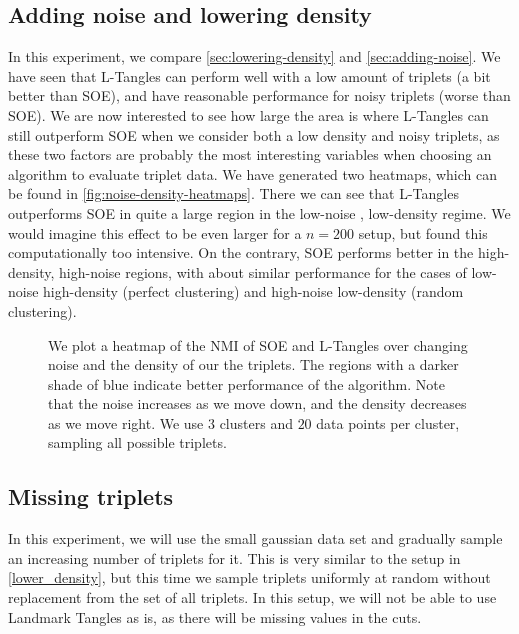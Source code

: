 \subsection{Adding noise and lowering density}
In this experiment, we compare \autoref{sec:lowering-density} and \autoref{sec:adding-noise}. We have seen that L-Tangles can perform well with a low
amount of triplets (a bit better than SOE), and have reasonable performance for noisy triplets (worse than SOE). We are now interested to see how large the area is
where L-Tangles can still outperform SOE when we consider both a low density and noisy triplets, as these two factors are probably the most interesting variables
when choosing an algorithm to evaluate triplet data. We have generated two heatmaps, which can be found in \autoref{fig:noise-density-heatmaps}. 
There we can see that L-Tangles outperforms SOE in quite a large region in the low-noise , low-density regime. We would imagine this effect to be even larger
for a $n=200$ setup, but found this computationally too intensive. On the contrary, SOE performs better in the high-density, high-noise regions, with about similar performance
for the cases of low-noise high-density (perfect clustering) and high-noise low-density (random clustering).

\onecolumn
\begin{figure}[ht]
    \centering
    \caption{
        We plot a heatmap of the NMI of SOE and L-Tangles over changing noise and the density of our the triplets. 
        The regions with a darker shade of blue indicate better performance of the algorithm. 
        Note that the noise increases as we move down, and the
        density decreases as we move right.  We use $3$ clusters and $20$ data points per cluster, sampling all possible triplets. 
    }
    \label{fig:noise-density-heatmaps}
\end{figure}

\subsection{Missing triplets}
In this experiment, we will use the small gaussian data set and gradually sample an increasing number of triplets for it. 
This is very similar to the setup in \autoref{lower_density}, but this time we sample triplets uniformly at random without replacement
from the set of all triplets. In this setup, we will not be able to use Landmark Tangles as is, as there will be missing values in the cuts. 

